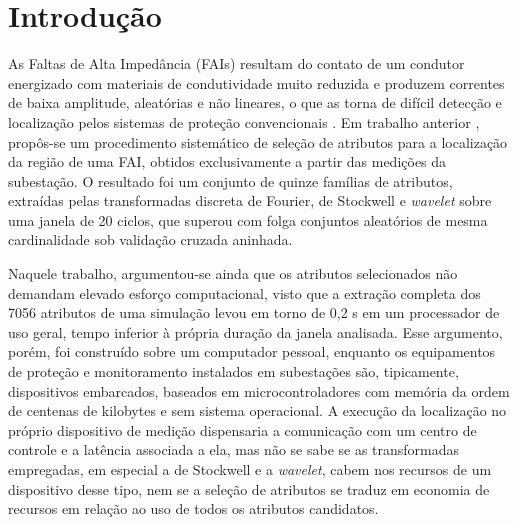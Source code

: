 \documentclass[
	12pt,				%
	openright,			%
	oneside,			%
	a4paper,			%
	english,			%
	brazil,				%
	]{abntex2}
\begin{document}
\frenchspacing

\imprimircapa
\imprimirfolhaderosto

\tableofcontents*
\cleardoublepage

\textual

\chapter{Introdução}

As Faltas de Alta Impedância (FAIs) resultam do contato de um condutor energizado com materiais de condutividade muito reduzida e produzem correntes de baixa amplitude, aleatórias e não lineares, o que as torna de difícil detecção e localização pelos sistemas de proteção convencionais \cite{[3]}. Em trabalho anterior \cite{martins_tcc}, propôs-se um procedimento sistemático de seleção de atributos para a localização da região de uma FAI, obtidos exclusivamente a partir das medições da subestação. O resultado foi um conjunto de quinze famílias de atributos, extraídas pelas transformadas discreta de Fourier, de Stockwell e \textit{wavelet} sobre uma janela de 20 ciclos, que superou com folga conjuntos aleatórios de mesma cardinalidade sob validação cruzada aninhada.

Naquele trabalho, argumentou-se ainda que os atributos selecionados não demandam elevado esforço computacional, visto que a extração completa dos 7056 atributos de uma simulação levou em torno de 0,2 s em um processador de uso geral, tempo inferior à própria duração da janela analisada. Esse argumento, porém, foi construído sobre um computador pessoal, enquanto os equipamentos de proteção e monitoramento instalados em subestações são, tipicamente, dispositivos embarcados, baseados em microcontroladores com memória da ordem de centenas de kilobytes e sem sistema operacional. A execução da localização no próprio dispositivo de medição dispensaria a comunicação com um centro de controle e a latência associada a ela, mas não se sabe se as transformadas empregadas, em especial a de Stockwell e a \textit{wavelet}, cabem nos recursos de um dispositivo desse tipo, nem se a seleção de atributos se traduz em economia de recursos em relação ao uso de todos os atributos candidatos.
\end{document}
